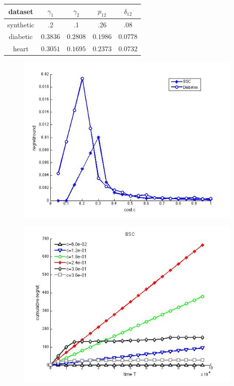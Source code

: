 \centering
\begin{tabular}[c]{c|c|c|c|c } 
	\label{tab:ErrorTable}
	
	dataset & $\gamma_1$ & $\gamma_2$ & $p_{12}$ & $\delta_{12}$\\ \hline 
	synthetic & .2 & .1 & .26 & .08\\  \hline
	diabetic & $0.3836 $ & $0.2808$ & $0.1986$ & 0.0778\\  \hline
	heart & $0.3051$ & $0.1695$ & $0.2373$ & 0.0732\\  \hline
\end{tabular}



\begin{figure}[!h]
	\centering
	\includegraphics[scale=.4]{../Simulations/RegVsCost.jpg}
\end{figure}

\begin{figure}[!h]
	\centering
	\includegraphics[scale=.4]{../Simulations/Synthetic/BSC.jpg}
\end{figure}
